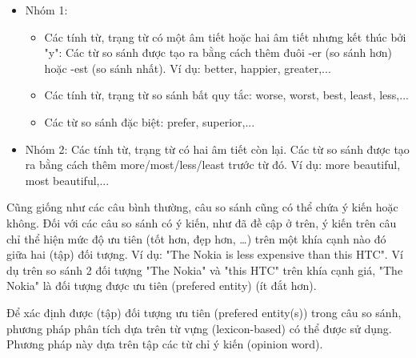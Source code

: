 \documentclass[12pt]{extarticle}
\begin{document}
				\begin{itemize}
					\item{Nhóm 1:}		
					\begin{itemize}	
						\item{Các tính từ, trạng từ có một âm tiết hoặc hai âm tiết nhưng kết thúc bởi "y": Các từ so sánh được tạo ra bằng cách thêm đuôi -er (so sánh hơn) hoặc -est (so sánh nhất). Ví dụ: better, happier, greater,...}
						\item{Các tính từ, trạng từ so sánh bất quy tắc: worse, worst, best, least, less,...}		
						\item{Các từ so sánh đặc biệt: prefer, superior,...}
					\end{itemize}
					\item{Nhóm 2: Các tính từ, trạng từ có hai âm tiết còn lại. Các từ so sánh được tạo ra bằng cách thêm more/most/less/least trước từ đó. Ví dụ: more beautiful, most beautiful,...}					
				\end{itemize}
				\par Cũng giống như các câu bình thường, câu so sánh cũng có thể chứa ý kiến hoặc không. Đối với các câu so sánh có ý kiến, như đã đề cập ở trên, ý kiến trên câu chỉ thể hiện mức độ ưu tiên (tốt hơn, đẹp hơn, …) trên một khía cạnh nào đó giữa hai (tập) đối tượng. Ví dụ: "The Nokia is less expensive than this HTC". Ví dụ trên so sánh 2 đối tượng "The Nokia" và "this HTC" trên khía cạnh giá, "The Nokia" là đối tượng được ưu tiên (prefered entity) (ít đắt hơn). 
				\par Để xác định được (tập) đối tượng ưu tiên (prefered entity(s)) trong câu so sánh, phương pháp phân tích dựa trên từ vựng (lexicon-based) có thể được sử dụng. Phương pháp này dựa trên tập các từ chỉ ý kiến (opinion word).
\end{document}
